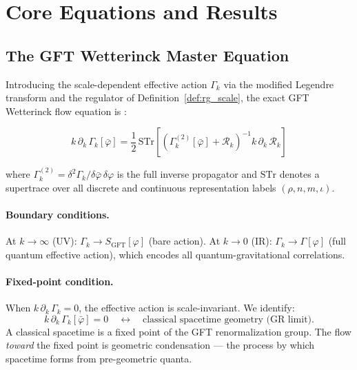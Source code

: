 \documentclass[12pt,a4paper]{article}
\newcommand{\GFT}{\mathrm{GFT}}
\newcommand{\STr}{\mathrm{STr}}
\newcommand{\Rk}{\mathcal{R}_k}
\newcommand{\Gk}{\Gamma_k}
\newcommand{\kdk}{k\,\partial_k}
\begin{document}
\section{Core Equations and Results}
\label{sec:equations}

\subsection{The GFT Wetterinck Master Equation}

Introducing the scale-dependent effective action $\Gk$ via the
modified Legendre transform and the regulator of
Definition~\ref{def:rg_scale}, the exact GFT Wetterinck flow equation
is \cite{ashtekar2004}:

\begin{equation}
\label{eq:wetterinck}
\boxed{
\kdk\,\Gk[\bar\varphi]
= \frac{1}{2}\,\STr\!\left[
\left(\Gk^{(2)}[\bar\varphi] + \Rk\right)^{-1}
\kdk\,\Rk
\right]}
\end{equation}

where $\Gk^{(2)} = \delta^2\Gk/\delta\bar\varphi\,\delta\varphi$ is
the full inverse propagator and $\STr$ denotes a supertrace over all
discrete and continuous representation labels $(\rho,n,m,\iota)$.

\paragraph{Boundary conditions.}
At $k\to\infty$ (UV): $\Gk \to S_\GFT[\varphi]$ (bare action).
At $k\to 0$ (IR): $\Gk \to \Gamma[\varphi]$ (full quantum effective
action), which encodes all quantum-gravitational correlations.

\paragraph{Fixed-point condition.}
When $\kdk\,\Gk = 0$, the effective action is scale-invariant.
We identify:
\begin{equation}
\label{eq:fixed_point}
\kdk\,\Gk[\bar\varphi] = 0
\quad\longleftrightarrow\quad
\text{classical spacetime geometry (GR limit)}.
\end{equation}
A classical spacetime is a fixed point of the GFT renormalization group.
The flow \emph{toward} the fixed point is geometric condensation —
the process by which spacetime forms from pre-geometric quanta.
\end{document}
